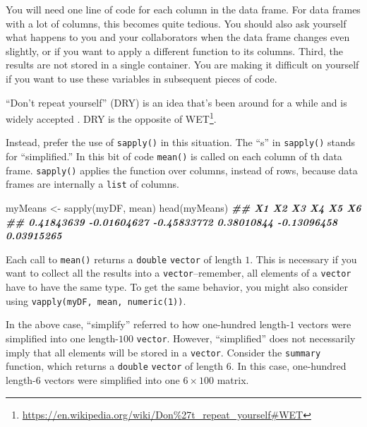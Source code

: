 \documentclass[
  12pt,
]{krantz}
\makeatletter
\newenvironment{Shaded}{\begin{snugshade}}{\end{snugshade}}
\newcommand{\DocumentationTok}[1]{\textcolor[rgb]{0.37,0.37,0.37}{\textbf{\textit{#1}}}}
\newcommand{\FunctionTok}[1]{\textcolor[rgb]{0,0,0}{#1}}
\newcommand{\NormalTok}[1]{#1}
\newcommand{\OtherTok}[1]{\textcolor[rgb]{0.37,0.37,0.37}{#1}}
\renewcommand{\href}[2]{#2\footnote{\url{#1}}}
\newenvironment{kframe}{%
\medskip{}
\setlength{\fboxsep}{.8em}
 \def\at@end@of@kframe{}%
 \ifinner\ifhmode%
  \def\at@end@of@kframe{\end{minipage}}%
  \begin{minipage}{\columnwidth}%
 \fi\fi%
 \def\FrameCommand##1{\hskip\@totalleftmargin \hskip-\fboxsep
 \colorbox{shadecolor}{##1}\hskip-\fboxsep
     \hskip-\linewidth \hskip-\@totalleftmargin \hskip\columnwidth}%
 \MakeFramed {\advance\hsize-\width
   \@totalleftmargin\z@ \linewidth\hsize
   \@setminipage}}%
 {\par\unskip\endMakeFramed%
 \at@end@of@kframe}
\renewenvironment{Shaded}{\begin{kframe}}{\end{kframe}}
\makeatother
\begin{document}
You will need one line of code for each column in the data frame. For data frames with a lot of columns, this becomes quite tedious. You should also ask yourself what happens to you and your collaborators when the data frame changes even slightly, or if you want to apply a different function to its columns. Third, the results are not stored in a single container. You are making it difficult on yourself if you want to use these variables in subsequent pieces of code.

``Don't repeat yourself'' (DRY) is an idea that's been around for a while and is widely accepted \citep{hunt2000pragmatic}. DRY is the opposite of \href{https://en.wikipedia.org/wiki/Don\%27t_repeat_yourself\#WET}{WET}.

Instead, prefer the use of \texttt{sapply()} in this situation. The ``s'' in \texttt{sapply()} stands for ``simplified.'' In this bit of code \texttt{mean()} is called on each column of th data frame. \texttt{sapply()} applies the function over columns, instead of rows, because data frames are internally a \texttt{list} of columns.

\begin{Shaded}
\begin{Highlighting}[]
\NormalTok{myMeans }\OtherTok{\textless{}{-}} \FunctionTok{sapply}\NormalTok{(myDF, mean)}
\FunctionTok{head}\NormalTok{(myMeans)}
\DocumentationTok{\#\#          X1          X2          X3          X4          X5          X6 }
\DocumentationTok{\#\#  0.41843639 {-}0.01604627 {-}0.45833772  0.38010844 {-}0.13096458  0.03915265}
\end{Highlighting}
\end{Shaded}

Each call to \texttt{mean()} returns a \texttt{double} \texttt{vector} of length \(1\). This is necessary if you want to collect all the results into a \texttt{vector}--remember, all elements of a \texttt{vector} have to have the same type. To get the same behavior, you might also consider using \texttt{vapply(myDF,\ mean,\ numeric(1))}.

In the above case, ``simplify'' referred to how one-hundred length-\(1\) vectors were simplified into one length-\(100\) \texttt{vector}. However, ``simplified'' does not necessarily imply that all elements will be stored in a \texttt{vector}. Consider the \texttt{summary} function, which returns a \texttt{double} \texttt{vector} of length \(6\). In this case, one-hundred length-\(6\) vectors were simplified into one \(6 \times 100\) matrix.
\end{document}
